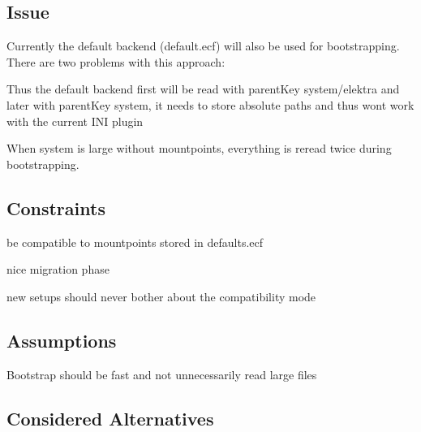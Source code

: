 \subsection*{Issue}

Currently the default backend (default.\+ecf) will also be used for bootstrapping. There are two problems with this approach\+:


\begin{DoxyEnumerate}
\item Thus the default backend first will be read with parent\+Key {\ttfamily system/elektra} and later with parent\+Key {\ttfamily system}, it needs to store absolute paths and thus won\textquotesingle{}t work with the current I\+NI plugin
\item When {\ttfamily system} is large without mountpoints, everything is reread twice during bootstrapping.
\end{DoxyEnumerate}

\subsection*{Constraints}


\begin{DoxyItemize}
\item be compatible to mountpoints stored in {\ttfamily defaults.\+ecf}
\item nice migration phase
\item new setups should never bother about the compatibility mode
\end{DoxyItemize}

\subsection*{Assumptions}


\begin{DoxyItemize}
\item Bootstrap should be fast and not unnecessarily read large files
\end{DoxyItemize}

\subsection*{Considered Alternatives}


